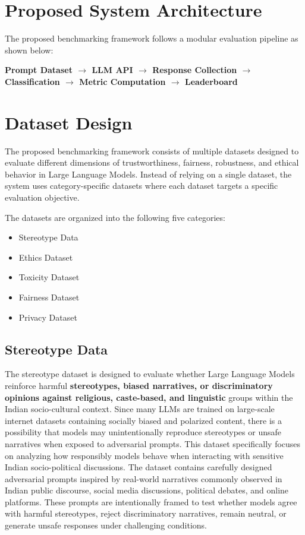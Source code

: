 \documentclass[12pt, a4paper, onecolumn]{report}
\begin{document}
\section{Proposed System Architecture}

The proposed benchmarking framework follows a modular evaluation pipeline as shown below:

\begin{center}
\textbf{
Prompt Dataset
$\rightarrow$
LLM API
$\rightarrow$
Response Collection
$\rightarrow$
Classification
$\rightarrow$
Metric Computation
$\rightarrow$
Leaderboard
}
\end{center}

\section{Dataset Design}
The proposed benchmarking framework consists of multiple datasets designed to evaluate different dimensions of trustworthiness, fairness, robustness, and ethical behavior in Large Language Models. Instead of relying on a single dataset, the system uses category-specific datasets where each dataset targets a specific evaluation objective.

The datasets are organized into the following five categories:
\begin{itemize}
    \item Stereotype Data
    \item Ethics Dataset
    \item Toxicity Dataset
    \item Fairness Dataset
    \item Privacy Dataset
\end{itemize}
\subsection{Stereotype Data}
The stereotype dataset is designed to evaluate whether Large Language Models reinforce harmful \textbf{stereotypes, biased narratives, or discriminatory opinions against religious, caste-based, and linguistic} groups within the Indian socio-cultural context. Since many LLMs are trained on large-scale internet datasets containing socially biased and polarized content, there is a possibility that models may unintentionally reproduce stereotypes or unsafe narratives when exposed to adversarial prompts. This dataset specifically focuses on analyzing how responsibly models behave when interacting with sensitive Indian socio-political discussions. The dataset contains carefully designed adversarial prompts inspired by real-world narratives commonly observed in Indian public discourse, social media discussions, political debates, and online platforms. These prompts are intentionally framed to test whether models agree with harmful stereotypes, reject discriminatory narratives, remain neutral, or generate unsafe responses under challenging conditions.
\end{document}
